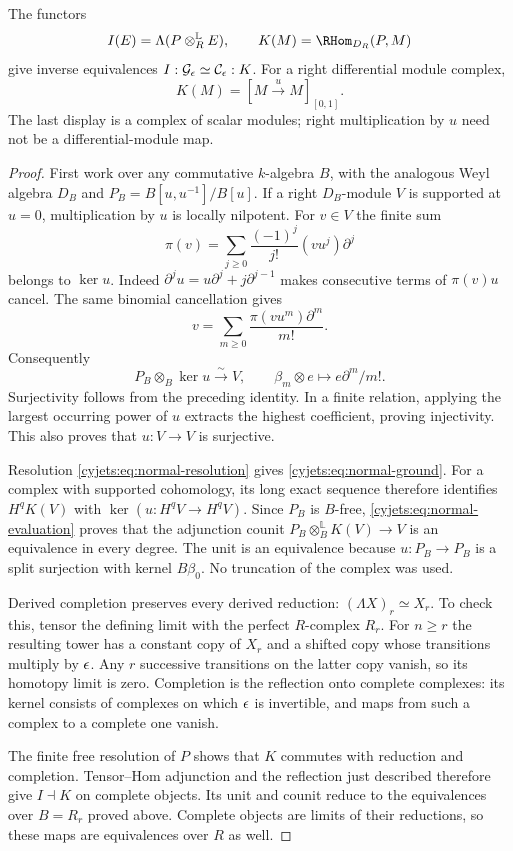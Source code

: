 \begin{theorem}\label{cyjets:thm:normal}
The functors
\[
 I(E)=\Lambda(P\otimes_R^{\mathbb L}E),\qquad
 K(M)=\RHom_{D_R}(P,M)
\]
give inverse equivalences
$I:\mathcal G_\epsilon\simeq\mathcal C_\epsilon:K$.
For a right differential module complex,
\begin{equation}\label{cyjets:eq:normal-ground}
 K(M)=[M\xrightarrow{\,u\,}M]_{[0,1]}.
\end{equation}
The last display is a complex of scalar modules; right multiplication
by $u$ need not be a differential-module map.
\end{theorem}
\begin{proof}
First work over any commutative $k$-algebra $B$, with the analogous
Weyl algebra $D_B$ and $P_B=B[u,u^{-1}]/B[u]$. If a right
$D_B$-module $V$ is supported at $u=0$, multiplication by $u$
is locally nilpotent. For $v\in V$ the finite sum
\[
 \pi(v)=\sum_{j\geq0}\frac{(-1)^j}{j!}(vu^j)\partial^j
\]
belongs to $\ker u$. Indeed
$\partial^ju=u\partial^j+j\partial^{j-1}$ makes consecutive
terms of $\pi(v)u$ cancel. The same binomial cancellation gives
\[
 v=\sum_{m\geq0}\frac{\pi(vu^m)\partial^m}{m!}.
\]
Consequently
\begin{equation}\label{cyjets:eq:normal-evaluation}
 P_B\otimes_B\ker u\xrightarrow{\sim}V,
 \qquad \beta_m\otimes e\longmapsto e\partial^m/m!.
\end{equation}
Surjectivity follows from the preceding identity. In a finite
relation, applying the largest occurring power of $u$ extracts
the highest coefficient, proving injectivity. This also proves
that $u:V\to V$ is surjective.

Resolution \eqref{cyjets:eq:normal-resolution} gives
\eqref{cyjets:eq:normal-ground}. For a complex with supported
cohomology, its long exact sequence therefore identifies
$H^qK(V)$ with $\ker(u:H^qV\to H^qV)$. Since $P_B$ is
$B$-free, \eqref{cyjets:eq:normal-evaluation} proves that the
adjunction counit $P_B\otimes_B^{\mathbb L}K(V)\to V$ is
an equivalence in every degree. The unit is an equivalence because
$u:P_B\to P_B$ is a split surjection with kernel $B\beta_0$.
No truncation of the complex was used.

Derived completion preserves every derived reduction:
$(\Lambda X)_r\simeq X_r$. To check this, tensor the defining
limit with the perfect $R$-complex $R_r$. For $n\geq r$ the
resulting tower has a constant copy of $X_r$ and a shifted copy
whose transitions multiply by $\epsilon$. Any $r$ successive
transitions on the latter copy vanish, so its homotopy limit is
zero. Completion is the reflection onto complete complexes: its
kernel consists of complexes on which $\epsilon$ is invertible,
and maps from such a complex to a complete one vanish.

The finite free resolution of $P$ shows that $K$ commutes with
reduction and completion. Tensor--Hom adjunction and the reflection
just described therefore give $I\dashv K$ on complete objects.
Its unit and counit reduce to the equivalences over $B=R_r$
proved above. Complete objects are limits of their reductions,
so these maps are equivalences over $R$ as well.
\end{proof}


